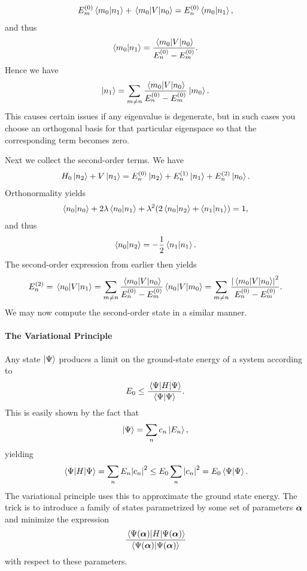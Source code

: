 \begin{align*}
	E_{m}^{(0)}\braket{m_{0}}{n_{1}} + \mel{m_{0}}{V}{n_{0}} = E_{n}^{(0)}\braket{m_{0}}{n_{1}},
\end{align*}
and thus
\begin{align*}
	\braket{m_{0}}{n_{1}} = \frac{\mel{m_{0}}{V}{n_{0}}}{E_{n}^{(0)} - E_{m}^{(0)}}.
\end{align*}
Hence we have
\begin{align*}
	\ket{n_{1}} = \sum\limits_{m\neq n}\frac{\mel{m_{0}}{V}{n_{0}}}{E_{n}^{(0)} - E_{m}^{(0)}}\ket{m_{0}}.
\end{align*}
This causes certain issues if any eigenvalue is degenerate, but in such cases you choose an orthogonal basis for that particular eigenspace so that the corresponding term becomes zero.

Next we collect the second-order terms. We have
\begin{align*}
	H_{0}\ket{n_{2}} + V\ket{n_{1}} = E_{n}^{(0)}\ket{n_{2}} + E_{n}^{(1)}\ket{n_{1}} + E_{n}^{(2)}\ket{n_{0}}.
\end{align*}
Orthonormality yields
\begin{align*}
	\braket{n_{0}} + 2\lambda\braket{n_{0}}{n_{1}} + \lambda^{2}(2\braket{n_{0}}{n_{2}} + \braket{n_{1}}{n_{1}}) = 1,
\end{align*}
and thus
\begin{align*}
	\braket{n_{0}}{n_{2}} = -\frac{1}{2}\braket{n_{1}}{n_{1}}.
\end{align*}
The second-order expression from earlier then yields
\begin{align*}
	E_{n}^{(2)} = \mel{n_{0}}{V}{n_{1}} = \sum\limits_{m\neq n}\frac{\mel{m_{0}}{V}{n_{0}}}{E_{n}^{(0)} - E_{m}^{(0)}}\mel{n_{0}}{V}{m_{0}} = \sum\limits_{m\neq n}\frac{\abs{\mel{m_{0}}{V}{n_{0}}}^{2}}{E_{n}^{(0)} - E_{m}^{(0)}}.
\end{align*}
We may now compute the second-order state in a similar manner.

\paragraph{The Variational Principle}
Any state $\ket{\Psi}$ produces a limit on the ground-state energy of a system according to
\begin{align*}
	E_{0} \leq \frac{\expval{H}{\Psi}}{\braket{\Psi}}.
\end{align*}
This is easily shown by the fact that
\begin{align*}
	\ket{\Psi} = \sum\limits_{n}c_{n}\ket{E_{n}},
\end{align*}
yielding
\begin{align*}
	\expval{H}{\Psi} = \sum\limits_{n}E_{n}\abs{c_{n}}^{2} \leq E_{0}\sum\limits_{n}\abs{c_{n}}^{2} = E_{0}\braket{\Psi}.
\end{align*}
The variational principle uses this to approximate the ground state energy. The trick is to introduce a family of states parametrized by some set of parameters $\vb*{\alpha}$ and minimize the expression
\begin{align*}
	\frac{\expval{H}{\Psi(\vb*{\alpha})}}{\braket{\Psi(\vb*{\alpha})}}
\end{align*}
with respect to these parameters.